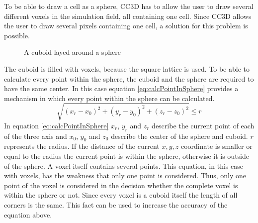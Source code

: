 To be able to draw a cell as a sphere, \ac{CC3D} has to allow the user to draw several different voxels in the simulation field, all containing one cell. Since \ac{CC3D} allows the user to draw several pixels containing one cell, a solution for this problem is possible.


\begin{figure}[ht]
\begin{center}
\caption[A cuboid layed around a sphere]{A cuboid layed around a sphere}
\label{tikz:SphereInCube}
\end{center}
\end{figure}


The cuboid is filled with voxels, because the square lattice is used.  To be able to calculate every point within the sphere, the cuboid and the sphere are required to have the same center. In this case equation \ref{eq:calcPointInSphere} provides a mechanism in which every point within the sphere can be calculated.
\begin{equation}\label{eq:calcPointInSphere}
\sqrt{(x_{r}-x_{0})^2 + (y_{r}-y_{0})^2 + (z_{r}-z_{0})^2} \leq r
\end{equation}
In equation \ref{eq:calcPointInSphere} $x_{r}$, $y_{r}$ and $z_{r}$ describe the current point of each of the three axis and $x_{0}$, $y_{0}$ and $z_{0}$ describe the center of the sphere and cuboid. $r$ represents the radius. If the distance of the current $x, y, z$ coordinate is smaller or equal to the radius the current point is within the sphere, otherwise it is outside of the sphere.
A voxel itself contains several points. This equation, in this case with voxels, has the weakness that only one point is considered. Thus, only one point of the voxel is considered in the decision whether the complete voxel is within the sphere or not. Since every voxel is a cuboid itself the length of all corners is the same. This fact can be used to increase the accuracy of the equation above.

